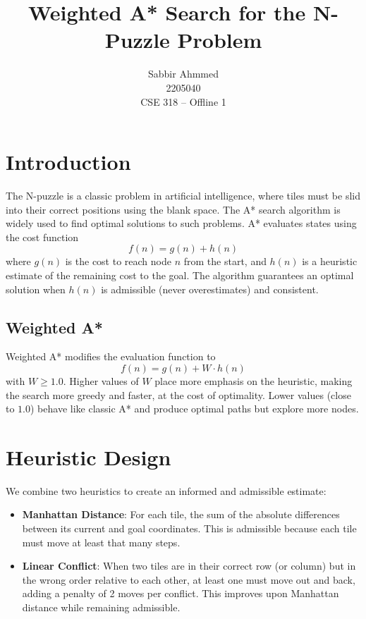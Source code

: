 \documentclass[12pt,a4paper]{article}
\title{Weighted A* Search for the N-Puzzle Problem}
\author{Sabbir Ahmmed \\ 2205040 \\ CSE 318 -- Offline 1}
\date{}
\begin{document}
\maketitle

\section{Introduction}

The N-puzzle is a classic problem in artificial intelligence, where tiles must be
slid into their correct positions using the blank space. The A* search algorithm
is widely used to find optimal solutions to such problems. A* evaluates states
using the cost function
\[
f(n) = g(n) + h(n)
\]
where $g(n)$ is the cost to reach node $n$ from the start, and $h(n)$ is a
heuristic estimate of the remaining cost to the goal. The algorithm guarantees
an optimal solution when $h(n)$ is admissible (never overestimates) and
consistent.

\subsection*{Weighted A*}

Weighted A* modifies the evaluation function to
\[
f(n) = g(n) + W \cdot h(n)
\]
with $W \ge 1.0$. Higher values of $W$ place more emphasis on the heuristic,
making the search more greedy and faster, at the cost of optimality. Lower
values (close to $1.0$) behave like classic A* and produce optimal paths but
explore more nodes.

\section{Heuristic Design}

We combine two heuristics to create an informed and admissible estimate:

\begin{itemize}
  \item \textbf{Manhattan Distance}: For each tile, the sum of the absolute
  differences between its current and goal coordinates. This is admissible
  because each tile must move at least that many steps.

  \item \textbf{Linear Conflict}: When two tiles are in their correct row (or
  column) but in the wrong order relative to each other, at least one must move
  out and back, adding a penalty of 2 moves per conflict. This improves upon
  Manhattan distance while remaining admissible.
\end{itemize}
\end{document}

